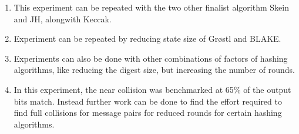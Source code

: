\begin{enumerate}
\item This experiment can be repeated with the two other finalist algorithm Skein and JH, alongwith Keccak.
\item Experiment can be repeated by reducing state size of Gr{\o}stl and BLAKE.
\item Experiments can also be done with other combinations of factors of hashing algorithms, like reducing the
digest size, but increasing the number of rounds.
\item In this experiment, the near collision was benchmarked at 65\% of the output bits match. Instead further work
can be done to find the effort required to find full collisions for message pairs for reduced rounds for
certain hashing algorithms.
\end{enumerate}
